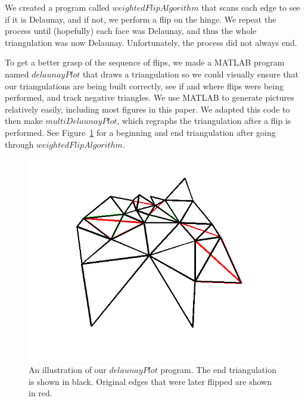 \documentclass[12pt]{article}
\begin{document}
 We created a program called $weightedFlipAlgorithm$ that scans each edge to see if it is Delaunay, and if not, we perform a flip on the hinge. We repeat the process until (hopefully) each face was Delaunay, and thus the whole triangulation was now Delaunay. Unfortunately, the process did not always end. 

 To get a better grasp of the sequence of flips, we made a MATLAB program named $delaunayPlot$ that draws a triangulation so we could visually ensure that our triangulations are being built correctly, see if and where flips were being performed, and track negative triangles. We use MATLAB to generate pictures relatively easily, including most figures in this paper. We adapted this code to then make $multiDelaunayPlot$, which regraphs the triangulation after a flip is performed. See Figure~\ref{genTri5} for a beginning and end triangulation after going through $weightedFlipAlgorithm$. 

\begin{figure}
\centering
\includegraphics[scale = 0.7]{Pictures/genTri5v2.png}
\caption{An illustration of our $delaunayPlot$ program. The end triangulation is shown in black. Original edges that were later flipped are shown in red.}
\label{genTri5}
\end{figure}
\end{document}
